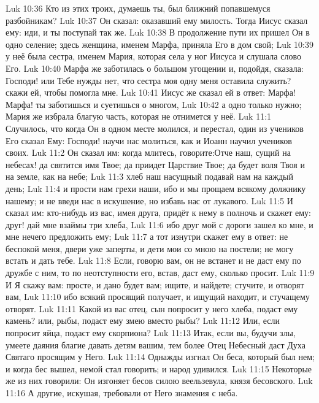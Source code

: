 \vs Luk 10:36 Кто из этих троих, думаешь ты, был ближний попавшемуся разбойникам?
\vs Luk 10:37 Он сказал: оказавший ему милость. Тогда Иисус сказал ему: иди, и ты поступай так же.
\rsbpar\vs Luk 10:38 В продолжение пути их пришел Он в одно селение; здесь женщина, именем Марфа, приняла Его в дом свой;
\vs Luk 10:39 у неё была сестра, именем Мария, которая села у ног Иисуса и слушала слово Его.
\vs Luk 10:40 Марфа же заботилась о большом угощении и, подойдя, сказала: Господи! или Тебе нужды нет, что сестра моя одну меня оставила служить? скажи ей, чтобы помогла мне.
\vs Luk 10:41 Иисус же сказал ей в ответ: Марфа! Марфа! ты заботишься и суетишься о многом,
\vs Luk 10:42 а одно только нужно; Мария же избрала благую часть, которая не отнимется у неё.
\vs Luk 11:1 Случилось, что когда Он в одном месте молился, и перестал, один из учеников Его сказал Ему: Господи! научи нас молиться, как и Иоанн научил учеников своих.
\vs Luk 11:2 Он сказал им: когда млитесь, говорите:\rsbpar Отче наш, сущий на небесах! да святится имя Твое; да приидет Царствие Твое; да будет воля Твоя и на земле, как на небе;
\vs Luk 11:3 хлеб наш насущный подавай нам на каждый день;
\vs Luk 11:4 и прости нам грехи наши, ибо и мы прощаем всякому должнику нашему; и не введи нас в искушение, но избавь нас от лукавого.
\rsbpar\vs Luk 11:5 И сказал им:  кто-нибудь из вас, имея друга, придёт к нему в полночь и скажет ему: друг! дай мне взаймы три хлеба,
\vs Luk 11:6 ибо друг мой с дороги зашел ко мне, и мне нечего предложить ему;
\vs Luk 11:7 а тот изнутри скажет ему в ответ: не беспокой меня, двери уже заперты, и дети мои со мною на постели; не могу встать и дать тебе.
\vs Luk 11:8 Если, говорю вам, он не встанет и не даст ему по дружбе с ним, то по неотступности его, встав, даст ему, сколько просит.
\vs Luk 11:9 И Я скажу вам: просте, и дано будет вам; ищите, и найдете; стучите, и отворят вам,
\vs Luk 11:10 ибо всякий просящий получает, и ищущий находит, и стучащему отворят.
\vs Luk 11:11 Какой из вас отец,  сын попросит у него хлеба, подаст ему камень? или,  рыбы, подаст ему змею вместо рыбы?
\vs Luk 11:12 Или, если попросит яйца, подаст ему скорпиона?
\vs Luk 11:13 Итак, если вы, будучи злы, умеете даяния благие давать детям вашим, тем более Отец Небесный даст Духа Святаго просящим у Него.
\rsbpar\vs Luk 11:14 Однажды изгнал Он беса, который был нем; и когда бес вышел, немой стал говорить; и народ удивился.
\vs Luk 11:15 Некоторые же из них говорили: Он изгоняет бесов силою веельзевула, князя бесовского.
\vs Luk 11:16 А другие, искушая, требовали от Него знамения с неба.
